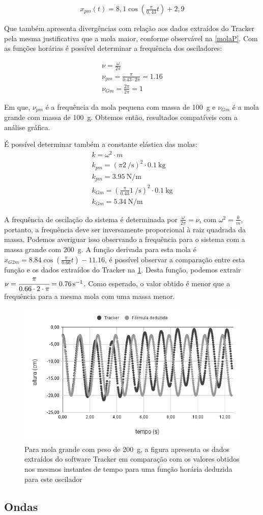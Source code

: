 \begin{align*}
x_{pm}(t) = 8,1 \cos(\frac{\pi}{0,43}t) + 2,9
\end{align*}

    Que também apresenta divergências com relação aos dados extraídos do Tracker pela mesma justificativa que a mola maior, conforme observável na \cref{molaP}.
    Com as funções horárias é possível determinar a frequência dos osciladores:

\begin{align*}
    \nu = \frac{\omega}{2\pi}\\
    \nu_{pm} = \frac{\pi}{\num{0,43} \cdot 2\pi} = \num{1,16}\\ 
    \nu_{Gm} = \frac{2\pi}{2\pi} = 1
\end{align*}

Em que, \(\nu_{pm}\) é a frequência da mola pequena com massa de \qty{100}{g} e \(\nu_{Gm}\) é a mola grande com massa de \qty{100}{g}. Obtemos então, resultados compatíveis com a análise gráfica.

É possível determinar também a constante elástica das molas:
\begin{align*}
   k = \omega^2 \cdot m\\
   k_{pm} = {(\pi\qty{2}{\per\second})}^2 \cdot \qty{0.1}{\kilo\gram}\\
   k_{pm} = \qty{3,95}{\N\per\meter}\\
   k_{Gm} = {(\frac{\pi}{0.43}\qty{1}{\per\second})}^2 \cdot \qty{0.1}{\kg}\\
   k_{Gm} = \qty{5.34}{\N\per\meter} 
\end{align*}

A frequência de oscilação do sistema é determinada por \(\frac{\omega}{2 \pi}  = \nu\), com \(\omega^2 = \frac{k}{m}\), portanto, a frequência deve ser inversamente proporcional à raiz quadrada da massa. Podemos averiguar isso observando a frequência para o sistema com a massa grande com \qty{200}{\g}. A função derivada para esta mola é \(x_{G2m} = 8.84\cos(\frac{\pi}{0.66}t) -11.16\), é possível observar a comparação entre esta função e os dados extraídos do Tracker na \cref{molaG2m}. Desta função, podemos extrair \(\nu = \cfrac{\pi}{0.66 \cdot 2 \cdot \pi} = \qty{0.76}{\per\second}\). Como esperado, o valor obtido é menor que a frequência para a mesma mola com uma massa menor.   

\begin{figure}[h]
    \centering
    \includegraphics[width=.5\linewidth]{fig/molaG2m}
    \caption{Para mola grande com peso de \qty{200}{\g}, a figura apresenta os dados extraídos do software Tracker em comparação com os valores obtidos nos mesmos instantes de tempo para uma função horária deduzida para este oscilador}
    \label{molaG2m}
\end{figure}

           
\subsection{Ondas}

    
